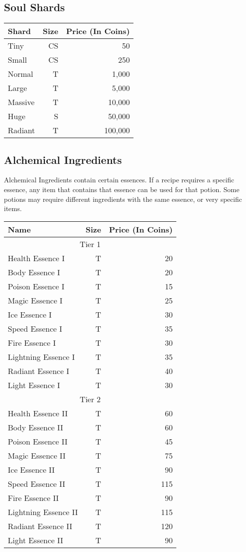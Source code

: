 \subsection{Soul Shards}\label{subsec:soulShards}
\begin{longtable}{l | r | r}
	Shard & Size & Price (In Coins)\\ \hline
	Tiny & CS & 50\\
	Small & CS & 250\\
	Normal & T & 1,000\\
	Large & T & 5,000\\
	Massive & T & 10,000\\
	Huge & S & 50,000\\
	Radiant & T & 100,000\\
\end{longtable}


\subsection{Alchemical Ingredients}\label{subsec:alchemicalIngredients}
Alchemical Ingredients contain certain essences.
If a recipe requires a specific essence, any item that contains that essence can be used for that potion.
Some potions may require different ingredients with the same essence, or very specific items. \\

\begin{longtable}{l | r | r}
	Name & Size & Price (In Coins)\\
	\hline
	\multicolumn{3}{c}{Tier 1}\\
	\hline
	Health Essence I & T & 20\\
	Body Essence I & T & 20\\
	Poison Essence I & T & 15\\
	Magic Essence I & T & 25\\
	Ice Essence I & T & 30\\
	Speed Essence I & T & 35\\
	Fire Essence I & T & 30\\
	Lightning Essence I & T & 35\\
	Radiant Essence I & T & 40\\
	Light Essence I & T & 30\\
	\hline
	\multicolumn{3}{c}{Tier 2}\\
	\hline
	Health Essence II & T & 60\\
	Body Essence II & T & 60\\
	Poison Essence II & T & 45\\
	Magic Essence II & T & 75\\
	Ice Essence II & T & 90\\
	Speed Essence II & T & 115\\
	Fire Essence II & T & 90\\
	Lightning Essence II & T & 115\\
	Radiant Essence II & T & 120\\
	Light Essence II & T & 90\\
\end{longtable}

